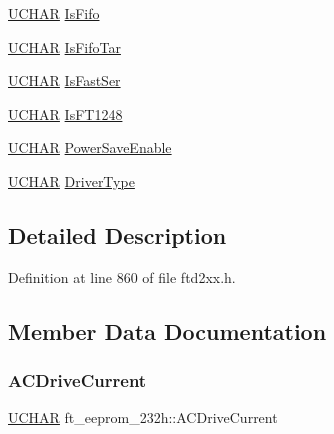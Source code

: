 \begin{DoxyCompactItemize}
\item 
\hyperlink{CatCaloProto40MHz_2inc_2WinTypes_8h_a4f4bb67531a9bf6f0b9c6ad76aeba587}{U\+C\+H\+AR} \hyperlink{structft__eeprom__232h_a5b6fa725478fe8f58ef4aa232ff4f6c4}{Is\+Fifo}
\item 
\hyperlink{CatCaloProto40MHz_2inc_2WinTypes_8h_a4f4bb67531a9bf6f0b9c6ad76aeba587}{U\+C\+H\+AR} \hyperlink{structft__eeprom__232h_a73d9b80c5b4c07b2085deeb4689b4371}{Is\+Fifo\+Tar}
\item 
\hyperlink{CatCaloProto40MHz_2inc_2WinTypes_8h_a4f4bb67531a9bf6f0b9c6ad76aeba587}{U\+C\+H\+AR} \hyperlink{structft__eeprom__232h_ad214d1fe4bf5bf916c5364777f9dc1a8}{Is\+Fast\+Ser}
\item 
\hyperlink{CatCaloProto40MHz_2inc_2WinTypes_8h_a4f4bb67531a9bf6f0b9c6ad76aeba587}{U\+C\+H\+AR} \hyperlink{structft__eeprom__232h_aa2b426719debc007b4ce6166524ca68f}{Is\+F\+T1248}
\item 
\hyperlink{CatCaloProto40MHz_2inc_2WinTypes_8h_a4f4bb67531a9bf6f0b9c6ad76aeba587}{U\+C\+H\+AR} \hyperlink{structft__eeprom__232h_a60637cdb433234aa02093455605abca9}{Power\+Save\+Enable}
\item 
\hyperlink{CatCaloProto40MHz_2inc_2WinTypes_8h_a4f4bb67531a9bf6f0b9c6ad76aeba587}{U\+C\+H\+AR} \hyperlink{structft__eeprom__232h_a629a028c1c415f2f9104fe7e30154039}{Driver\+Type}
\end{DoxyCompactItemize}


\subsection{Detailed Description}


Definition at line 860 of file ftd2xx.\+h.



\subsection{Member Data Documentation}
\mbox{\label{structft__eeprom__232h_a8cb3fbf23ced09e59165178aee3f3c57}} 
\subsubsection{\texorpdfstring{A\+C\+Drive\+Current}{ACDriveCurrent}}
{\footnotesize\ttfamily \hyperlink{CatCaloProto40MHz_2inc_2WinTypes_8h_a4f4bb67531a9bf6f0b9c6ad76aeba587}{U\+C\+H\+AR} ft\+\_\+eeprom\+\_\+232h\+::\+A\+C\+Drive\+Current}



